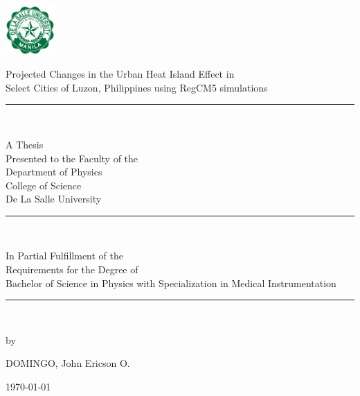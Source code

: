 \begin{center}

	\includegraphics[width=0.14\textwidth]{../format/DLSU_Logo} 
	\vspace{4ex}
	
	\begin{Spacing}{1.5} 
		Projected Changes in the Urban Heat Island Effect in \\
		Select Cities of Luzon, Philippines using RegCM5 simulations \\
	\end{Spacing}
	\vfill
	
	\rule{3cm}{0.5pt}\\
	\vfill
	
	
	A Thesis\\
	Presented to the Faculty of the \\
	Department of Physics \\
	College of Science \\
	De La Salle University \\
	\vfill
	
	\rule{3cm}{0.5pt}\\
	\vfill
	
	In Partial Fulfillment of the\\
	Requirements for the Degree of\\
	Bachelor of Science in Physics with Specialization in Medical Instrumentation\\
	\vfill
	
	\rule{3cm}{0.5pt}\\
	\vfill
	
	by \\
	\vspace{2.5ex}
	
	DOMINGO, John Ericson O.
	\vspace{2.5ex}
	
	\today \\
\end{center}

\clearpage